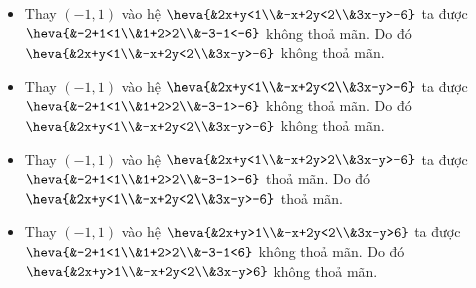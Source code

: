 \begin{ex}
{\begin{itemize}
			\item Thay $(-1{,}1)$ vào hệ $\heva{&2x+y<1\\&-x+2y<2\\&3x-y>-6}$ ta được $\heva{&-2+1<1\\&1+2>2\\&-3-1<-6}$ không thoả mãn. Do  đó $\heva{&2x+y<1\\&-x+2y<2\\&3x-y>-6}$ không thoả mãn.
			\item Thay $(-1{,}1)$  vào hệ $\heva{&2x+y<1\\&-x+2y<2\\&3x-y>-6}$ ta được $\heva{&-2+1<1\\&1+2>2\\&-3-1>-6}$ không thoả mãn. Do đó $\heva{&2x+y<1\\&-x+2y<2\\&3x-y>-6}$ không thoả mãn.
			\item Thay $(-1{,}1)$ vào hệ $\heva{&2x+y<1\\&-x+2y>2\\&3x-y>-6}$ ta được $\heva{&-2+1<1\\&1+2>2\\&-3-1>-6}$ thoả mãn. Do đó  $\heva{&2x+y<1\\&-x+2y<2\\&3x-y>-6}$ thoả mãn.
			\item Thay $(-1{,}1)$ vào  hệ $\heva{&2x+y>1\\&-x+2y<2\\&3x-y>6}$ ta được $\heva{&-2+1<1\\&1+2>2\\&-3-1<6}$ không thoả mãn. Do đó $\heva{&2x+y>1\\&-x+2y<2\\&3x-y>6}$ không thoả mãn.
	\end{itemize} }
\end{ex}


